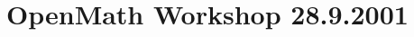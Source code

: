 \documentclass[11pt, a4paper]{article}
\begin{document}

\section{OpenMath Workshop 28.9.2001}
\end{document}
